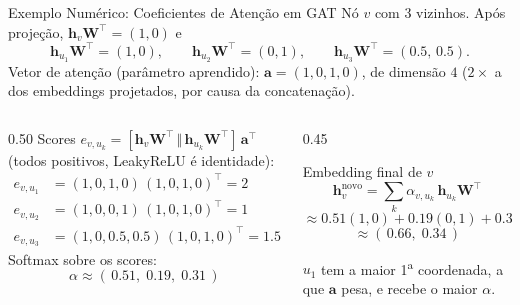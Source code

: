 \documentclass[aspectratio=169,xcolor=dvipsnames]{beamer}
\begin{document}
  \begin{frame}{Exemplo Numérico: Coeficientes de Atenção em GAT}
    Nó $v$ com 3 vizinhos. Após projeção, $\mathbf{h}_v \mathbf{W}^{\top} = (1, 0)$ e
    \[
      \mathbf{h}_{u_1} \mathbf{W}^{\top} = (1, 0), \qquad
      \mathbf{h}_{u_2} \mathbf{W}^{\top} = (0, 1), \qquad
      \mathbf{h}_{u_3} \mathbf{W}^{\top} = (0.5,\, 0.5).
    \]
    Vetor de atenção (parâmetro aprendido): $\mathbf{a} = (1, 0, 1, 0)$, de dimensão $4$ ($2\times$ a dos embeddings projetados, por causa da concatenação).
    \begin{columns}[T]
      \begin{column}{0.50\textwidth}
        Scores $e_{v,u_k} = [\mathbf{h}_v \mathbf{W}^{\top} \,\Vert\, \mathbf{h}_{u_k} \mathbf{W}^{\top}]\, \mathbf{a}^{\top}$
        (todos positivos, LeakyReLU é identidade):
        \begin{align*}
          e_{v, u_1} &= (1,0,1,0)\,(1,0,1,0)^{\top} = 2 \\
          e_{v, u_2} &= (1,0,0,1)\,(1,0,1,0)^{\top} = 1 \\
          e_{v, u_3} &= (1,0,0.5,0.5)\,(1,0,1,0)^{\top} = 1.5
        \end{align*}
        Softmax sobre os scores:
        \[
          \alpha \approx (\, 0.51,\; 0.19,\; 0.31 \,)
        \]
      \end{column}
      \begin{column}{0.45\textwidth}
        \begin{block}{Embedding final de $v$}
          \[
            \mathbf{h}_v^{\text{novo}} = \sum_{k} \alpha_{v, u_k}\, \mathbf{h}_{u_k} \mathbf{W}^{\top}
          \]
          \[
            \approx 0.51(1,0) + 0.19(0,1) + 0.31(0.5,0.5)
          \]
          \[
            \approx (\, 0.66,\; 0.34 \,)
          \]
        \end{block}
        $u_1$ tem a maior 1\textsuperscript{a} coordenada, a que $\mathbf{a}$ pesa,
        e recebe o maior $\alpha$.
      \end{column}
    \end{columns}
  \end{frame}
\end{document}
